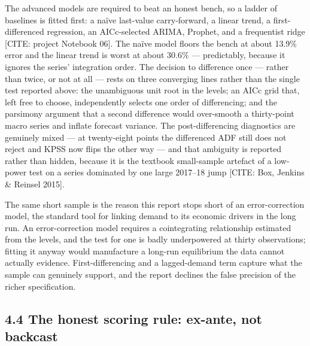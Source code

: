\documentclass[10pt,twocolumn]{article}
\newcommand{\mk}[1]{{\color{amber}\small #1}}
\begin{document}
The advanced models are required to beat an honest bench, so a ladder of baselines is fitted first: a naïve last-value carry-forward, a linear trend, a first-differenced regression, an AICc-selected ARIMA, Prophet, and a frequentist ridge \mk{[CITE: project Notebook 06]}. The naïve model floors the bench at about 13.9\% error and the linear trend is worst at about 30.6\% --- predictably, because it ignores the series' integration order. The decision to difference once --- rather than twice, or not at all --- rests on three converging lines rather than the single test reported above: the unambiguous unit root in the levels; an AICc grid that, left free to choose, independently selects one order of differencing; and the parsimony argument that a second difference would over-smooth a thirty-point macro series and inflate forecast variance. The post-differencing diagnostics are genuinely mixed --- at twenty-eight points the differenced ADF still does not reject and KPSS now flips the other way --- and that ambiguity is reported rather than hidden, because it is the textbook small-sample artefact of a low-power test on a series dominated by one large 2017--18 jump \mk{[CITE: Box, Jenkins \& Reinsel 2015]}.

The same short sample is the reason this report stops short of an error-correction model, the standard tool for linking demand to its economic drivers in the long run. An error-correction model requires a cointegrating relationship estimated from the levels, and the test for one is badly underpowered at thirty observations; fitting it anyway would manufacture a long-run equilibrium the data cannot actually evidence. First-differencing and a lagged-demand term capture what the sample can genuinely support, and the report declines the false precision of the richer specification.

\subsection*{4.4 The honest scoring rule: ex-ante, not backcast}
\end{document}
